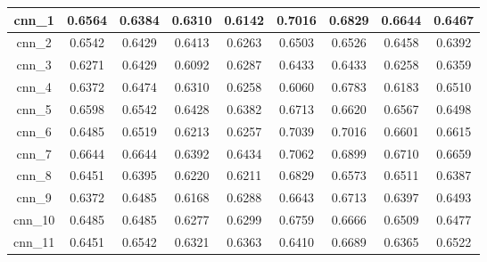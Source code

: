 \begin{table}[p]
\begin{tabular}{|c|c|c|c|c|c|c|c|c|}
        cnn\_1   & 0.6564                        & 0.6384                         & 0.6310                      & 0.6142                  & 0.7016 & 0.6829 & 0.6644 & 0.6467 \\ \hline
        cnn\_2   & 0.6542                        & 0.6429                         & 0.6413                      & 0.6263                  & 0.6503 & 0.6526 & 0.6458 & 0.6392 \\ \hline
        cnn\_3   & 0.6271                        & 0.6429                         & 0.6092                      & 0.6287                  & 0.6433 & 0.6433 & 0.6258 & 0.6359 \\ \hline
        cnn\_4   & 0.6372                        & 0.6474                         & 0.6310                      & 0.6258                  & 0.6060 & 0.6783 & 0.6183 & 0.6510 \\ \hline
        cnn\_5   & 0.6598                        & 0.6542                         & 0.6428                      & 0.6382                  & 0.6713 & 0.6620 & 0.6567 & 0.6498 \\ \hline
        cnn\_6   & 0.6485                        & 0.6519                         & 0.6213                      & 0.6257                  & 0.7039 & 0.7016 & 0.6601 & 0.6615 \\ \hline
        cnn\_7   & 0.6644                        & 0.6644                         & 0.6392                      & 0.6434                  & 0.7062 & 0.6899 & 0.6710 & 0.6659 \\ \hline
        cnn\_8   & 0.6451                        & 0.6395                         & 0.6220                      & 0.6211                  & 0.6829 & 0.6573 & 0.6511 & 0.6387 \\ \hline
        cnn\_9   & 0.6372                        & 0.6485                         & 0.6168                      & 0.6288                  & 0.6643 & 0.6713 & 0.6397 & 0.6493 \\ \hline
        cnn\_10  & 0.6485                        & 0.6485                         & 0.6277                      & 0.6299                  & 0.6759 & 0.6666 & 0.6509 & 0.6477 \\ \hline
        cnn\_11  & 0.6451                        & 0.6542                         & 0.6321                      & 0.6363                  & 0.6410 & 0.6689 & 0.6365 & 0.6522 \\ \hline
    \end{tabular}
\end{table}


